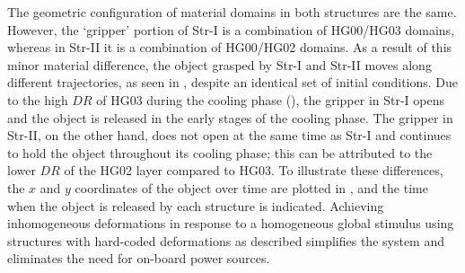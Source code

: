 The geometric configuration of material domains in both structures are the same. However, the `gripper' portion of Str-I is a combination of HG00/HG03 domains, whereas in Str-II it is a combination of HG00/HG02 domains. As a result of this minor material difference, the object grasped by Str-I and Str-II moves along different trajectories, as seen in , despite an identical set of initial conditions. Due to the high $DR$ of HG03 during the cooling phase (), the gripper in Str-I opens and the object is released in the early stages of the cooling phase. The gripper in Str-II, on the other hand, does not open at the same time as Str-I and continues to hold the object throughout its cooling phase; this can be attributed to the lower $DR$ of the HG02 layer compared to HG03. To illustrate these differences, the $x$ and $y$ coordinates of the object over time are plotted in , and the time when the object is released by each structure is indicated. Achieving inhomogeneous deformations in response to a homogeneous global stimulus using structures with hard-coded deformations as described simplifies the system and eliminates the need for on-board power sources.\\ 

